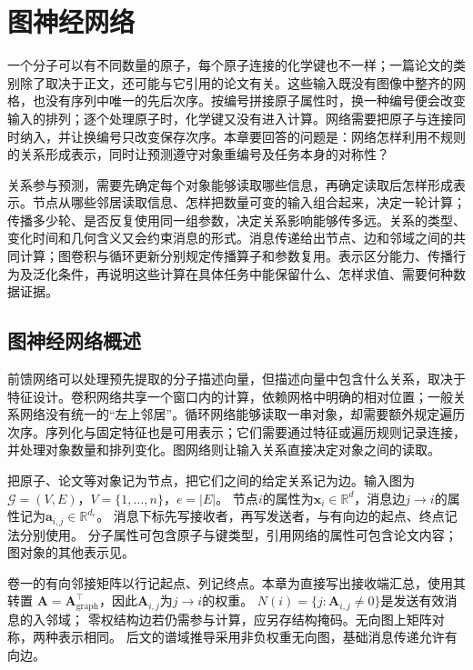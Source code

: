 \chapter{图神经网络}
\label{chap:graph-networks}

一个分子可以有不同数量的原子，每个原子连接的化学键也不一样；一篇论文的类别除了取决于正文，还可能与它引用的论文有关。这些输入既没有图像中整齐的网格，也没有序列中唯一的先后次序。按编号拼接原子属性时，换一种编号便会改变输入的排列；逐个处理原子时，化学键又没有进入计算。网络需要把原子与连接同时纳入，并让换编号只改变保存次序。本章要回答的问题是：网络怎样利用不规则的关系形成表示，同时让预测遵守对象重编号及任务本身的对称性？

关系参与预测，需要先确定每个对象能够读取哪些信息，再确定读取后怎样形成表示。节点从哪些邻居读取信息、怎样把数量可变的输入组合起来，决定一轮计算；传播多少轮、是否反复使用同一组参数，决定关系影响能够传多远。关系的类型、变化时间和几何含义又会约束消息的形式。消息传递给出节点、边和邻域之间的共同计算；图卷积与循环更新分别规定传播算子和参数复用。表示区分能力、传播行为及泛化条件，再说明这些计算在具体任务中能保留什么、怎样求值、需要何种数据证据。

\section{图神经网络概述}
\label{sec:gnn-overview}

前馈网络可以处理预先提取的分子描述向量，但描述向量中包含什么关系，取决于特征设计。卷积网络共享一个窗口内的计算，依赖网格中明确的相对位置；一般关系网络没有统一的“左上邻居”。循环网络能够读取一串对象，却需要额外规定遍历次序。序列化与固定特征也是可用表示；它们需要通过特征或遍历规则记录连接，并处理对象数量和排列变化。图网络则让输入关系直接决定对象之间的读取。

把原子、论文等对象记为节点，把它们之间的给定关系记为边。输入图为$\mathcal G=(V,E)$，$V=\{1,\ldots,n\}$，$e=|E|$。
节点$i$的属性为$\bm x_i\in\mathbb R^d$，消息边$j\to i$的属性记为$\bm a_{i,j}\in\mathbb R^{d_e}$。
消息下标先写接收者，再写发送者，与有向边的起点、终点记法分别使用。
分子属性可包含原子与键类型，引用网络的属性可包含论文内容；图对象的其他表示见。

卷一的有向邻接矩阵以行记起点、列记终点。本章为直接写出接收端汇总，使用其转置
$\bm A=\bm A_{\mathrm{graph}}^\top$，因此$\bm A_{i,j}$为$j\to i$的权重。
$N(i)=\{j:\bm A_{i,j}\ne0\}$是发送有效消息的入邻域；
零权结构边若仍需参与计算，应另存结构掩码。无向图上矩阵对称，两种表示相同。
后文的谱域推导采用非负权重无向图，基础消息传递允许有向边。

